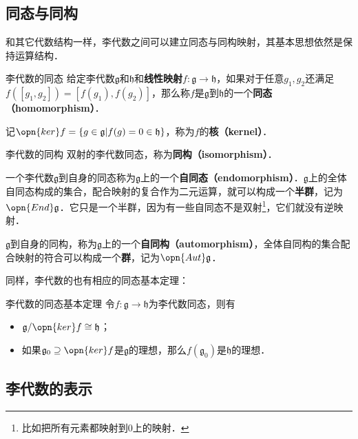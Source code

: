 


\subsection{同态与同构}

和其它代数结构一样，李代数之间可以建立同态与同构映射，其基本思想依然是保持运算结构．

\begin{definition}{李代数的同态}
给定李代数$\mathfrak{g}$和$\mathfrak{h}$和\textbf{线性映射}$f:\mathfrak{g}\to\mathfrak{h}$，如果对于任意$g_1, g_2$还满足$f([g_1, g_2])=[f(g_1), f(g_2)]$，那么称$f$是$\mathfrak{g}$到$\mathfrak{h}$的一个\textbf{同态（homomorphism）}．

记$\opn{ker}f =\{g\in\mathfrak{g}|f(g)=0\in\mathfrak{h}\}$，称为$f$的\textbf{核（kernel）}．
\end{definition}

\begin{definition}{李代数的同构}
双射的李代数同态，称为\textbf{同构（isomorphism）}．
\end{definition}

一个李代数$\mathfrak{g}$到自身的同态称为$\mathfrak{g}$上的一个\textbf{自同态（endomorphism）}．$\mathfrak{g}$上的全体自同态构成的集合，配合映射的复合作为二元运算，就可以构成一个\textbf{半群}，记为$\opn{End}\mathfrak{g}$．它只是一个半群，因为有一些自同态不是双射\footnote{比如把所有元素都映射到$0$上的映射．}，它们就没有逆映射．

$\mathfrak{g}$到自身的同构，称为$\mathfrak{g}$上的一个\textbf{自同构（automorphism）}，全体自同构的集合配合映射的符合可以构成一个\textbf{群}，记为$\opn{Aut}\mathfrak{g}$．

同样，李代数的也有相应的同态基本定理：

\begin{definition}{李代数的同态基本定理}
令$f:\mathfrak{g}\to \mathfrak{h}$为李代数同态，则有
\begin{itemize}
\item $\mathfrak{g}/\opn{ker} f\cong \mathfrak{h}$；
\item 如果$\mathfrak{g}_0\supseteq \opn{ker}f$是$\mathfrak{g}$的理想，那么$f(\mathfrak{g}_0)$是$\mathfrak{h}$的理想．
\end{itemize}
\end{definition}


\subsection{李代数的表示}

